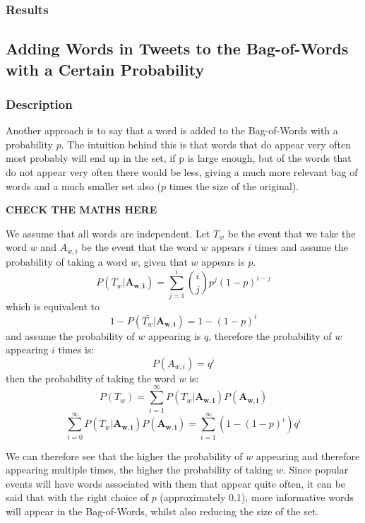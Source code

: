 \documentclass[11pt,a4paper]{article}
\begin{document}
\subsubsection{Results}
\subsection{Adding Words in Tweets to the Bag-of-Words with a Certain Probability}
\subsubsection{Description}
Another approach is to say that a word is added to the Bag-of-Words with a probability $p$. The intuition behind this is that words that do appear very often most probably will end up in the set, if p is large enough, but of the words that do not appear very often there would be less, giving a much more relevant bag of words and a much smaller set also ($p$ times the size of the original).


\textbf{CHECK THE MATHS HERE}


We assume that all words are independent. Let $T_w$ be the event that we take the word $w$ and $A_{w, i}$ be the event that the word $w$ appears $i$ times and assume the probability of taking a word $w$, given that $w$ appears is $p$. 
\begin{equation*}
P\left( T_w | \mathbf{A_{w, i}}\right) =  \sum_{j=1}^i {i \choose j} p^j\left( 1 - p\right)^{i-j}
\end{equation*}
which is equivalent to 
\begin{equation}
1 - P(\bar{T_w} |  \mathbf{A_{w, i}}) = 1 - (1 - p)^i
\end{equation}
and assume the probability of $w$ appearing is $q$, therefore the probability of $w$ appearing $i$ times is:
\begin{equation}
P\left(A_{w, i}\right) = q^i
\end{equation}
then the probability of taking the word $w$ is:
\begin{equation*}
P(T_w) = \sum_{i=1}^\infty P\left(T_w| \mathbf{A_{w, i}} \right) P( \mathbf{A_{w, i}})
\end{equation*}
\begin{equation}
\sum_{i=0}^\infty P\left(T_w| \mathbf{A_{w, i}} \right) P( \mathbf{A_{w, i}}) =\sum_{i=1}^\infty \left(1 - (1 - p)^i\right) q^i
\end{equation}

We can therefore see that the higher the probability of $w$ appearing and therefore appearing multiple times, the higher the probability of taking $w$. Since popular events will have words associated with them that appear quite often, it can be said that with the right choice of $p$ (approximately 0.1), more informative words will appear in the Bag-of-Words, whilst also reducing the size of the set. 
\end{document}
